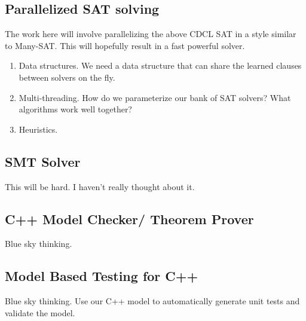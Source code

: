 \subsection{Parallelized SAT solving}
The work here will involve parallelizing the above CDCL SAT in a style similar to Many-SAT. This will hopefully result in a fast powerful solver.
\begin{enumerate}
\item Data structures. We need a data structure that can share the learned clauses between solvers on the fly.
\item Multi-threading. How do we parameterize our bank of SAT solvers? What algorithms work well together? 
\item Heuristics.
\end{enumerate}

\subsection{SMT Solver}
This will be hard. I haven't really thought about it.

\subsection{C++ Model Checker/ Theorem Prover}
Blue sky thinking.

\subsection{Model Based Testing for C++}
Blue sky thinking. Use our C++ model to automatically generate unit tests and validate the model.

